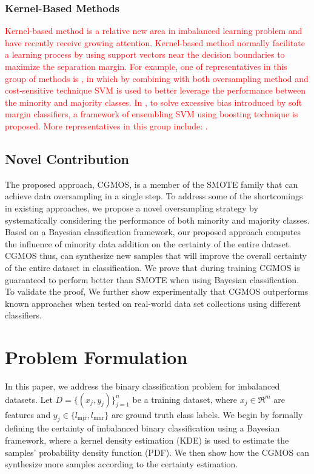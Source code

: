 \documentclass[10pt,journal,compsoc]{IEEEtran}
\begin{document}
\subsubsection{Kernel-Based Methods}
\textcolor{red}{Kernel-based method is a relative new area in imbalanced learning problem and have recently receive growing attention. Kernel-based method normally facilitate a learning process by using support vectors near the decision boundaries to maximize the separation margin. For example, one of representatives in this group of methods is \cite{Akbani04applyingsupport}, in which by combining with both oversampling method and cost-sensitive technique SVM is used to better leverage the performance between the minority and majority classes. In \cite{wang2008boosting}, to solve excessive bias introduced by soft margin classifiers, a framework of ensembling SVM using boosting technique is proposed. More representatives in this group include: \cite{vilarino2005experiments}\cite{kang2006eus}\cite{liu2006boosting}.}

\subsection{Novel Contribution}
The proposed approach, CGMOS, is a member of the SMOTE family that can achieve data oversampling in a single step. To address some of the shortcomings in existing approaches, we propose a novel oversampling strategy by systematically considering the performance of both minority and majority classes. Based on a Bayesian classification framework, our proposed approach computes the influence of minority data addition on the certainty of the entire dataset. CGMOS thus, can synthesize new samples that will improve the overall certainty of the entire dataset in classification. We prove that during training CGMOS is guaranteed to perform better than SMOTE when using Bayesian classification. To validate the proof, We further show experimentally that CGMOS outperforms known approaches when tested on real-world data set collections using different classifiers.

\section{Problem Formulation}
\label{sec: problem formulation}
In this paper, we address the binary classification problem for imbalanced datasets. Let $D=\{(x_j, y_j)\}_{j=1}^n$ be a training dataset, where $x_j \in \mathfrak{R}^m$ are features and $y_j \in \{l_{\mbox{mjr}}, l_{\mbox{mnr}}\}$ are ground truth class labels. We begin by formally defining the certainty of imbalanced binary classification using a Bayesian framework, where a kernel density estimation (KDE) is used to estimate the samples' probability density function (PDF). We then show how the CGMOS can synthesize more samples according to the certainty estimation.
\end{document}

